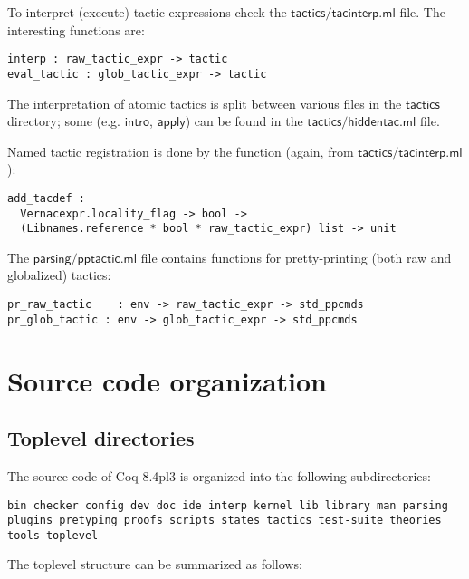 \documentclass[a4paper,oneside]{book}
\newcommand{\m}[1]{\ensuremath{\mathsf{#1}}}
\begin{document}
To interpret (execute) tactic expressions check the
\m{tactics/tacinterp.ml} file. The interesting functions are:
\begin{lstlisting}
interp : raw_tactic_expr -> tactic
eval_tactic : glob_tactic_expr -> tactic
\end{lstlisting}
The interpretation of atomic tactics is split between various files in
the \m{tactics} directory; some (e.g. \m{intro}, \m{apply}) can be
found in the \m{tactics/hiddentac.ml} file.

Named tactic registration is done by the function (again, from
\m{tactics/tacinterp.ml}):
\begin{lstlisting}
add_tacdef :
  Vernacexpr.locality_flag -> bool ->
  (Libnames.reference * bool * raw_tactic_expr) list -> unit
\end{lstlisting}

The \m{parsing/pptactic.ml} file contains functions for
pretty-printing (both raw and globalized) tactics:

\begin{lstlisting}
pr_raw_tactic    : env -> raw_tactic_expr -> std_ppcmds
pr_glob_tactic : env -> glob_tactic_expr -> std_ppcmds
\end{lstlisting}

\chapter{Source code organization}

\section{Toplevel directories}

The source code of Coq 8.4pl3 is organized into the following
subdirectories:
\begin{lstlisting}
bin checker config dev doc ide interp kernel lib library man parsing
plugins pretyping proofs scripts states tactics test-suite theories
tools toplevel
\end{lstlisting}

\noindent
The toplevel structure can be summarized as follows: \\
\end{document}
